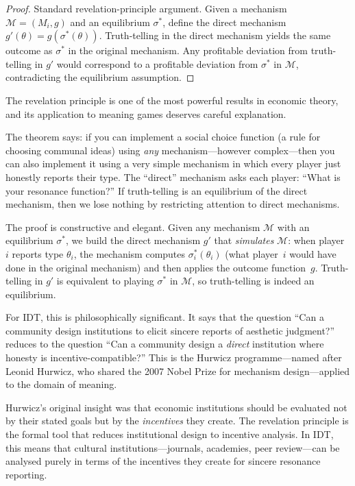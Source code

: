\begin{proof}
Standard revelation-principle argument.  Given a mechanism
$\mathcal{M}=(M_i,g)$ and an equilibrium $\sigma^*$, define
the direct mechanism $g'(\theta) = g(\sigma^*(\theta))$.
Truth-telling in the direct mechanism yields the same outcome
as $\sigma^*$ in the original mechanism.  Any profitable
deviation from truth-telling in $g'$ would correspond to a
profitable deviation from $\sigma^*$ in $\mathcal{M}$,
contradicting the equilibrium assumption.
\end{proof}

\begin{remark}
The revelation principle is one of the most powerful results in
economic theory, and its application to meaning games deserves
careful explanation.

The theorem says: if you can implement a social choice function
(a rule for choosing communal ideas) using \emph{any} mechanism---however
complex---then you can also implement it using a very simple mechanism
in which every player just honestly reports their type.  The ``direct''
mechanism asks each player: ``What is your resonance function?''  If
truth-telling is an equilibrium of the direct mechanism, then we lose
nothing by restricting attention to direct mechanisms.

The proof is constructive and elegant.  Given any mechanism $\mathcal{M}$
with an equilibrium $\sigma^*$, we build the direct mechanism $g'$ that
\emph{simulates} $\mathcal{M}$: when player~$i$ reports type $\theta_i$,
the mechanism computes $\sigma^*_i(\theta_i)$ (what player~$i$ would
have done in the original mechanism) and then applies the outcome
function~$g$.  Truth-telling in $g'$ is equivalent to playing $\sigma^*$
in $\mathcal{M}$, so truth-telling is indeed an equilibrium.

For IDT, this is philosophically significant.  It says that the
question ``Can a community design institutions to elicit sincere
reports of aesthetic judgment?'' reduces to the question ``Can a
community design a \emph{direct} institution where honesty is
incentive-compatible?''  This is the Hurwicz programme---named after
Leonid Hurwicz, who shared the 2007 Nobel Prize for mechanism design---applied
to the domain of meaning.

Hurwicz's original insight was that economic institutions should be
evaluated not by their stated goals but by the \emph{incentives} they
create.  The revelation principle is the formal tool that reduces
institutional design to incentive analysis.  In IDT, this means
that cultural institutions---journals, academies, peer review---can
be analysed purely in terms of the incentives they create for
sincere resonance reporting.
\end{remark}

